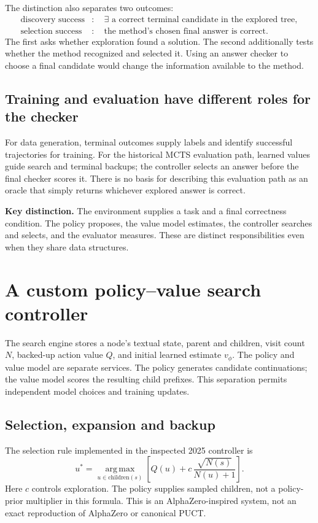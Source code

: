 \documentclass[11pt,letterpaper]{article}
\newcommand{\takeaway}[1]{\par\smallskip\noindent\colorbox{pale}{\parbox{\dimexpr\linewidth-2\fboxsep\relax}{\small\textbf{Key distinction.} #1}}\par\smallskip}
\begin{document}
The distinction also separates two outcomes:
\begin{align}
\text{discovery success}&:\quad\exists\text{ a correct terminal candidate in the explored tree},\\
\text{selection success}&:\quad\text{the method's chosen final answer is correct}.
\end{align}
The first asks whether exploration found a solution. The second additionally tests whether the method recognized and selected it. Using an answer checker to choose a final candidate would change the information available to the method.

\subsection{Training and evaluation have different roles for the checker}
For data generation, terminal outcomes supply labels and identify successful trajectories for training. For the historical MCTS evaluation path, learned values guide search and terminal backups; the controller selects an answer before the final checker scores it. There is no basis for describing this evaluation path as an oracle that simply returns whichever explored answer is correct.

\takeaway{The environment supplies a task and a final correctness condition. The policy proposes, the value model estimates, the controller searches and selects, and the evaluator measures. These are distinct responsibilities even when they share data structures.}

\section{A custom policy--value search controller}
The search engine stores a node's textual state, parent and children, visit count $N$, backed-up action value $Q$, and initial learned estimate $v_\phi$. The policy and value model are separate services. The policy generates candidate continuations; the value model scores the resulting child prefixes. This separation permits independent model choices and training updates.

\subsection{Selection, expansion and backup}
The selection rule implemented in the inspected 2025 controller is
\begin{equation}
u^*=\operatorname*{arg\,max}_{u\in\mathrm{children}(s)}
\left[Q(u)+c\,\frac{\sqrt{N(s)}}{N(u)+1}\right].
\label{eq:selection}
\end{equation}
Here $c$ controls exploration. The policy supplies sampled children, not a policy-prior multiplier in this formula. This is an AlphaZero-inspired system, not an exact reproduction of AlphaZero or canonical PUCT.
\end{document}
